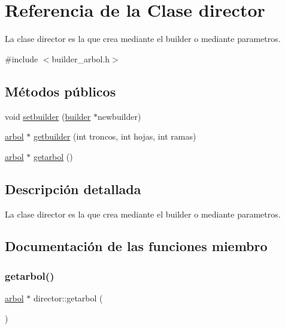 \hypertarget{classdirector}{}\section{Referencia de la Clase director}
\label{classdirector}


La clase director es la que crea mediante el builder o mediante parametros.  




{\ttfamily \#include $<$builder\+\_\+arbol.\+h$>$}

\subsection*{Métodos públicos}
\begin{DoxyCompactItemize}
\item 
void \hyperlink{classdirector_aa9381a46c45a3d6dce30e42e839b90b0}{setbuilder} (\hyperlink{classbuilder}{builder} $\ast$newbuilder)
\item 
\hyperlink{classarbol}{arbol} $\ast$ \hyperlink{classdirector_a0b674bd34130fdad9fabfc432efb09e4}{getbuilder} (int troncos, int hojas, int ramas)
\item 
\hyperlink{classarbol}{arbol} $\ast$ \hyperlink{classdirector_a9c548cff23b93ce5951318caacef264b}{getarbol} ()
\end{DoxyCompactItemize}


\subsection{Descripción detallada}
La clase director es la que crea mediante el builder o mediante parametros. 

\subsection{Documentación de las funciones miembro}
\mbox{\label{classdirector_a9c548cff23b93ce5951318caacef264b}} 
\subsubsection{\texorpdfstring{getarbol()}{getarbol()}}
{\footnotesize\ttfamily \hyperlink{classarbol}{arbol} $\ast$ director\+::getarbol (\begin{DoxyParamCaption}{ }\end{DoxyParamCaption})}

